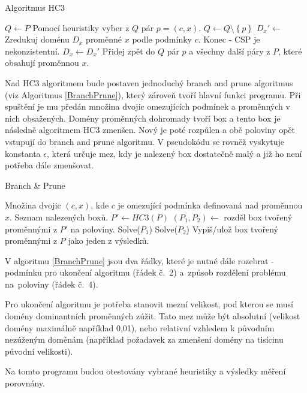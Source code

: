 \begin{algorithm}
\caption{Algoritmus HC3}
\label{HC3Algorithm}
\begin{algorithmic}[1]
\State $Q \gets P$
\State Pomocí heuristiky vyber z $Q$ pár $p = (c, x)$.
\State $Q \gets Q \setminus \left\{ p \right\}$
\State $D_x' \gets$ Zredukuj doménu $D_x$ proměnné $x$ podle podmínky $c$.
\State Konec - CSP je nekonzistentní.
\EndIf
{}
\State $D_x \gets D_x'$
\State Přidej zpět do $Q$ pár $p$ a všechny další páry z $P$, které obsahují proměnnou $x$.
\EndIf
\EndWhile
\EndProcedure
\end{algorithmic}
\end{algorithm}

Nad HC3 algoritmem bude postaven jednoduchý branch and prune algoritmus (viz Algoritmus \ref{BranchPrune}), který zároveň tvoří hlavní funkci programu. Při spuštění je mu předán množina dvojic omezujících podmínek a proměnných v nich obsažených. Domény proměnných dohromady tvoří box a tento box je následně algoritmem HC3 zmenšen. Nový je poté rozpůlen a obě poloviny opět vstupují do branch and prune algoritmu. V pseudokódu se rovněž vyskytuje konstanta $\epsilon$, která určuje mez, kdy je nalezený box dostatečně malý a již ho není potřeba dále zmenšovat.

\begin{algorithm}
\caption{Branch \& Prune}
\label{BranchPrune}
\begin{algorithmic}[1]
\Require Množina dvojic $(c, x)$, kde $c$ je omezující podmínka definovaná nad proměnnou $x$.
\Ensure Seznam nalezených boxů.
\State $P' \gets HC3(P)$
\State $(P_1, P_2) \gets $ rozděl box tvořený proměnnými z $P'$ na poloviny.
\State Solve($P_1$)
\State Solve($P_2$)
\Else
\State Vypiš/ulož box tvořený proměnnými z $P$ jako jeden z výsledků.
\EndIf
\EndProcedure
\end{algorithmic}
\end{algorithm}

V algoritmu \ref{BranchPrune} jsou dva řádky, které je nutné dále rozebrat - podmínku pro ukončení algoritmu (řádek č.~2) a~způsob rozdělení problému na~poloviny (řádek č.~4).

Pro ukončení algoritmu je potřeba stanovit mezní velikost, pod kterou se musí domény dominantních proměnných zúžit. Tato mez může být absolutní (velikost domény maximálně například 0,01), nebo relativní vzhledem k původním nezúženým doménám (například požadavek za zmenšení domény na tisícinu původní velikosti).

Na tomto programu budou otestovány vybrané heuristiky a výsledky měření porovnány.